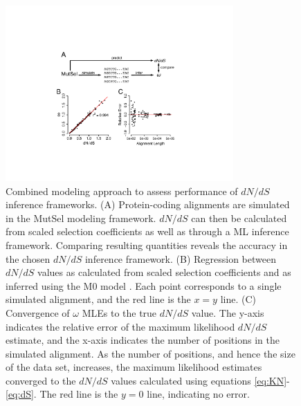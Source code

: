\documentclass[11pt]{article}
\begin{document}
		
\vspace{2cm}
		
\begin{figure}[htbp]
	\centerline{\includegraphics[width=8.7cm]{figures/MainText/regression_convergence.pdf}}
	\caption{\label{reg_conv} Combined modeling approach to assess performance of $dN/dS$ inference frameworks. (A) Protein-coding alignments are simulated in the MutSel modeling framework. $dN/dS$ can then be calculated from scaled selection coefficients as well as through a ML inference framework. Comparing resulting quantities reveals the accuracy in the chosen $dN/dS$ inference framework. (B) Regression between $dN/dS$ values as calculated from scaled selection coefficients and as inferred using the M0 model \cite{GoldmanYang1994,NielsenYang1998,Yangetal2000}. Each point corresponds to a single simulated alignment, and the red line is the $x=y$ line. (C) Convergence of $\omega$ MLEs to the true $dN/dS$ value. The y-axis indicates the relative error of the maximum likelihood $dN/dS$ estimate, and the x-axis indicates the number of positions in the simulated alignment. As the number of positions, and hence the size of the data set, increases, the maximum likelihood estimates converged to the $dN/dS$ values calculated using equations \eqref{eq:KN}-\eqref{eq:dS}. The red line is the $y=0$ line, indicating no error.}
\end{figure}
	
\vspace{2cm}
	
\end{document}
